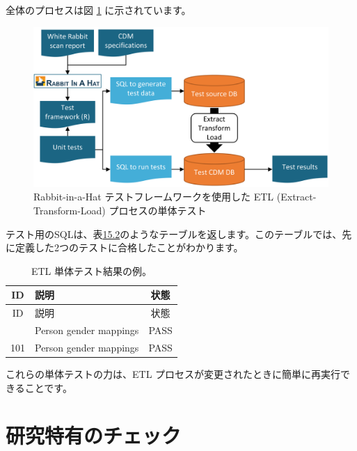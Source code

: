 \documentclass[
  11pt]{book}
\theoremstyle{definition}
\theoremstyle{definition}
\theoremstyle{definition}
\theoremstyle{definition}
\theoremstyle{remark}
\begin{document}
全体のプロセスは図 \ref{fig:testFramework} に示されています。

\begin{figure}

{\centering \includegraphics[width=0.9\linewidth]{images/DataQuality/testFramework} 

}

\caption{Rabbit-in-a-Hat テストフレームワークを使用した ETL (Extract-Transform-Load) プロセスの単体テスト}\label{fig:testFramework}
\end{figure}

テスト用のSQLは、表\href{https://ohdsi.github.io/TheBookOfOhdsi/DataQuality.html\#tab:exampleTestResults}{15.2}のようなテーブルを返します。このテーブルでは、先に定義した2つのテストに合格したことがわかります。

\begin{longtable}[]{@{}clc@{}}
\caption{\label{tab:exampleTestResults} ETL 単体テスト結果の例。}\tabularnewline
\toprule\noalign{}
ID & 説明 & 状態 \\
\midrule\noalign{}
\endfirsthead
\toprule\noalign{}
ID & 説明 & 状態 \\
\midrule\noalign{}
\endhead
\bottomrule\noalign{}
\endlastfoot
101 & Person gender mappings & PASS \\
101 & Person gender mappings & PASS \\
\end{longtable}

これらの単体テストの力は、ETL プロセスが変更されたときに簡単に再実行できることです。

\section{研究特有のチェック}\label{ux7814ux7a76ux7279ux6709ux306eux30c1ux30a7ux30c3ux30af}

\end{document}
